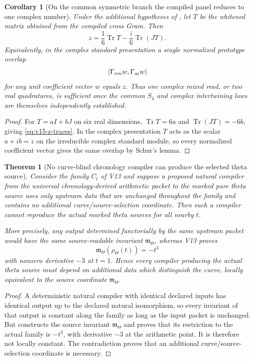\documentclass[11pt]{article}
\newtheorem{theorem}{Theorem}[section]
\newtheorem{corollary}[corollary]{Corollary}
\theoremstyle{definition}
\theoremstyle{remark}
\newcommand{\Tr}{\operatorname{Tr}}
\newcommand{\ip}[2]{\langle#1,#2\rangle}
\begin{document}
\begin{corollary}[On the common symmetric branch the compiled panel reduces to one complex number]
\label{cor:v15-word-native-z}
Under the additional hypotheses of , let $T$ be the
whitened matrix obtained from the compiled cross Gram.  Then
\begin{equation}
 \boxed{
 z
 =\frac16\Tr T
 -\frac{i}{6}\Tr(JT).}
 \label{eq:v15-z-traces}
\end{equation}
Equivalently, in the complex standard presentation a single normalized
prototype overlap
\[
 \ip{\Gamma_{\rm ren}w}{\Gamma_{\rm ar}w}
\]
for any unit coefficient vector $w$ equals $z$.  Thus one complex mixed read,
or two real quadratures, is sufficient once the common $S_4$ and complex
intertwining laws are themselves independently established.
\end{corollary}

\begin{proof}
For $T=aI+bJ$ on six real dimensions,
$\Tr T=6a$ and
$\Tr(JT)=-6b$, giving \eqref{eq:v15-z-traces}.  In the complex presentation
$T$ acts as the scalar $a+ib=z$ on the irreducible complex standard module,
so every normalized coefficient vector gives the same overlap by Schur's
lemma.
\end{proof}

\begin{theorem}[No curve-blind chronology compiler can produce the selected theta source]
\label{thm:v15-curve-blind-no-go}
Consider the family $C_t$ of V13 and suppose a proposed natural compiler from
the universal chronology-derived arithmetic packet to the marked pure theta
source uses only upstream data that are unchanged throughout the family and
contains no additional curve/source-selection coordinate.  Then such a
compiler cannot reproduce the actual marked theta sources for all nearby
$t$.

More precisely, any output determined functorially by the same upstream
packet would have the same source-readable invariant $\mathfrak m_\Theta$,
whereas V13 proves
\[
 \boxed{\mathfrak m_\Theta(\rho_\Theta(t))=-t^3}
\]
with nonzero derivative $-3$ at $t=1$.  Hence every compiler producing the
actual theta source must depend on additional data which distinguish the
curve, locally equivalent to the source coordinate $\mathfrak m_\Theta$.
\end{theorem}

\begin{proof}
A deterministic natural compiler with identical declared inputs has identical
output up to the declared natural isomorphism, so every invariant of that
output is constant along the family as long as the input packet is unchanged.
But  constructs the source invariant
$\mathfrak m_\Theta$ and proves that its restriction to the actual family is
$-t^3$, with derivative $-3$ at the arithmetic point.  It is therefore not
locally constant.  The contradiction proves that an additional
curve/source-selection coordinate is necessary.
\end{proof}
\end{document}
